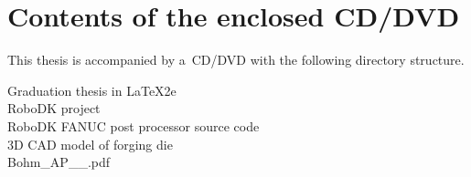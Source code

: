 ﻿\chapter{Contents of the enclosed CD/DVD \label{ch:ApendCD}}

This thesis is accompanied by a~CD/DVD with the following directory structure.

\begin{description}

    \item[Graduation thesis in \LaTeX2e] 
            
    \item[RoboDK project] 

    \item[RoboDK FANUC post processor source code] 

    \item[3D CAD model of forging die] 

    \item[Bohm\_AP\_\the\value{YearOld}\_\Year.pdf] 

\end{description}


